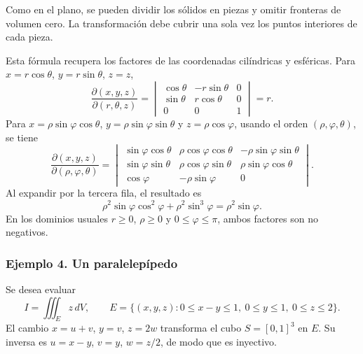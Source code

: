 Como en el plano, se pueden dividir los sólidos en piezas y omitir fronteras de volumen cero. La transformación debe cubrir una sola vez los puntos interiores de cada pieza.

Esta fórmula recupera los factores de las coordenadas cilíndricas y esféricas. Para $x=r\cos\theta$, $y=r\sin\theta$, $z=z$,
\[
\frac{\partial(x,y,z)}{\partial(r,\theta,z)}
=\begin{vmatrix}\cos\theta&-r\sin\theta&0\\
\sin\theta&r\cos\theta&0\\0&0&1\end{vmatrix}=r.
\]
Para $x=\rho\sin\varphi\cos\theta$, $y=\rho\sin\varphi\sin\theta$ y $z=\rho\cos\varphi$, usando el orden $(\rho,\varphi,\theta)$, se tiene
\[
\frac{\partial(x,y,z)}{\partial(\rho,\varphi,\theta)}
=\begin{vmatrix}
\sin\varphi\cos\theta&\rho\cos\varphi\cos\theta&-\rho\sin\varphi\sin\theta\\
\sin\varphi\sin\theta&\rho\cos\varphi\sin\theta&\rho\sin\varphi\cos\theta\\
\cos\varphi&-\rho\sin\varphi&0
\end{vmatrix}.
\]
Al expandir por la tercera fila, el resultado es
\[
\rho^2\sin\varphi\cos^2\varphi
+\rho^2\sin^3\varphi=\rho^2\sin\varphi.
\]
En los dominios usuales $r\geq0$, $\rho\geq0$ y $0\leq\varphi\leq\pi$, ambos factores son no negativos.

\subsubsection{Ejemplo 4. Un paralelepípedo}

Se desea evaluar
\[
I=\iiint_E z\,dV,
\qquad E=\{(x,y,z):0\leq x-y\leq1,\ 0\leq y\leq1,\ 0\leq z\leq2\}.
\]
El cambio $x=u+v$, $y=v$, $z=2w$ transforma el cubo $S=[0,1]^3$ en $E$. Su inversa es $u=x-y$, $v=y$, $w=z/2$, de modo que es inyectivo.

